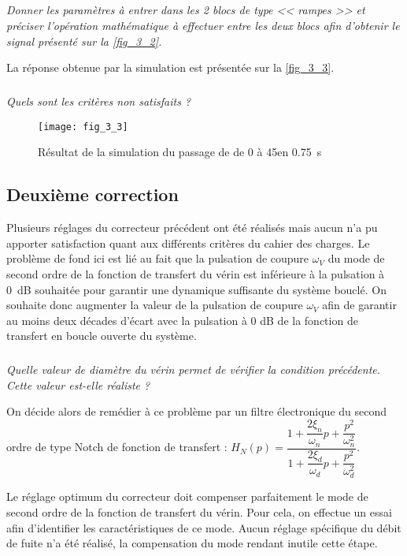 \subparagraph{}
\textit{Donner les paramètres à entrer dans les 2 blocs de type << rampes >> et préciser l'opération mathématique à effectuer entre les deux blocs afin d'obtenir le signal présenté sur la \autoref{fig_3_2}.}
\ifprof
\begin{corrige}
\end{corrige}
\else
\fi

La réponse obtenue par la simulation est présentée sur la \autoref{fig_3_3}.

\subparagraph{}
\textit{Quels sont les critères non satisfaits ?}
\ifprof
\begin{corrige}
\end{corrige}
\else
\fi


\begin{figure}[H]
\centering
\texttt{[image: fig\_3\_3]}
\caption{Résultat de la simulation du passage de de 0 à 45\degres en \SI{0,75}{s}}
\label{fig_3_3}
\end{figure}




\subsection*{Deuxième correction}

Plusieurs réglages du correcteur précédent ont été réalisés mais aucun n'a pu apporter satisfaction quant aux différents critères du cahier des charges. Le problème de fond ici est lié au fait que la pulsation de coupure $\omega_V$ du mode de second ordre de la fonction de transfert du vérin est inférieure à la pulsation à \SI{0}{dB} souhaitée pour garantir une dynamique suffisante du système bouclé. On souhaite donc augmenter la valeur de la pulsation de coupure $\omega_V$ afin de garantir au moins deux décades d'écart avec la pulsation à 0 dB de la fonction de transfert en boucle ouverte du système.

\subparagraph{}
\textit{Quelle valeur de diamètre du vérin permet de vérifier la condition précédente. Cette valeur est-elle réaliste ?}
\ifprof
\begin{corrige}
\end{corrige}
\else
\fi


On décide alors de remédier à ce problème par un filtre électronique du second ordre de type Notch 
de fonction de transfert :
$H_{N}(p)=\dfrac{1+ \dfrac{2\xi_n}{\omega_n}p + \dfrac{p^2}{\omega_n^2} }{1+ \dfrac{2\xi_d}{\omega_d}p + \dfrac{p^2}{\omega_d^2} }$.

Le réglage optimum du correcteur doit compenser parfaitement le mode de second ordre de la fonction de transfert du vérin. Pour cela, on effectue un essai afin d'identifier les caractéristiques de ce mode. Aucun réglage spécifique du débit de fuite n'a été réalisé, la compensation du mode rendant inutile cette étape.

